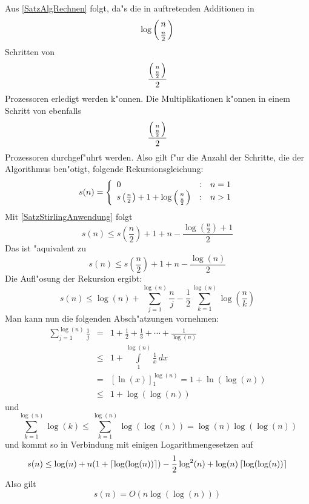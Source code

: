Aus \ref{SatzAlgRechnen} folgt, da"s die in
 auftretenden Additionen in
\[ \log \left( {  n  \atop  \frac{n}{2}  } \right) \] Schritten von
\[ \frac{ \left( {  n  \atop  \frac{n}{2} } \right) }{2} \] Prozessoren erledigt werden
k"onnen. Die Multiplikationen k"onnen in einem Schritt von ebenfalls
\[ \frac{ \left( {  n  \atop  \frac{n}{2} } \right) }{2} \] Prozessoren durchgef"uhrt
werden. Also gilt f"ur die Anzahl der Schritte, die der Algorithmus 
ben"otigt, folgende Rekursionsgleichung:
\[
   s(n) = \left\{
              \begin{array}{lcr}
                  0 & : & n = 1
              \\ s\left( \frac{n}{2} \right) + 1 +
                 \log \left( {  n  \atop  \frac{n}{2}  } \right)
                   & : & n > 1
              \end{array}
          \right.
\]
Mit \ref{SatzStirlingAnwendung} folgt
\[ s(n)
       \leq
   s\left( \frac{n}{2} \right) + 1 +
   n - \frac{\log \left( \frac{n}{2} \right) + 1}{2}
\]
Das ist "aquivalent zu
\[
   s(n)
       \leq
   s\left( \frac{n}{2} \right) + 1 +
   n - \frac{\log(n)}{2}
\]
Die Aufl"osung der Rekursion ergibt:
\[
   s(n)
       \leq
   \log(n) + \sum_{j=1}^{\log(n)} \frac{n}{j} -
   \frac{1}{2} \sum_{k=1}^{\log(n)} \log\left( \frac{n}{k} \right)
\]
Man kann nun die folgenden Absch"atzungen vornehmen:
\begin{eqnarray*}
   \sum_{j=1}^{\log(n)} \frac{1}{j}
       & = &
   1 + \frac{1}{2} + \frac{1}{3} + \cdots + \frac{1}{\log(n)}
\\
   & \leq & 1 + \int\limits_1^{\log(n)} \frac{1}{x} \, dx
\\
   & = & [ \ln(x) ]_1^{\log(n)} = 1 + \ln(\log(n))
\\ 
   & \leq & 1 + \log(\log(n))
\end{eqnarray*}
und
\[
   \sum_{k=1}^{\log(n)} \log(k)
       \leq
   \sum_{k=1}^{\log(n)} \log(\log(n))
       =
   \log(n)\log(\log(n))
\]
und kommt so in Verbindung mit einigen Logarithmengesetzen auf
\[
   s(n)
       \leq
   \log(n) + n (1 + \left\lceil \log(\log(n)) \right\rceil ) 
   - \frac{1}{2} \log^2(n) + \log(n) \left\lceil \log(\log(n)) \right\rceil
\] %
Also gilt \[ s(n) = O(n\log(\log(n))) \]

